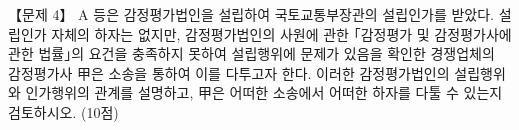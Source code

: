 \begin{longquestion}{【문제 4】}
A 등은 감정평가법인을 설립하여 국토교통부장관의 설립인가를 받았다. 설립인가 자체의 하자는 없지만, 감정평가법인의 사원에 관한 ｢감정평가 및 감정평가사에 관한 법률｣의 요건을 충족하지 못하여 설립행위에 문제가 있음을 확인한 경쟁업체의 감정평가사 甲은 소송을 통하여 이를 다투고자 한다. 이러한 감정평가법인의 설립행위와 인가행위의 관계를 설명하고, 甲은 어떠한 소송에서 어떠한 하자를 다툴 수 있는지 검토하시오. (10점) \par
\end{longquestion}
